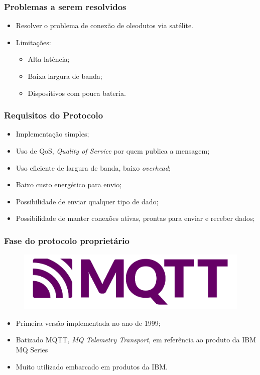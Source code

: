\documentclass[12pt]{beamer}
\begin{document}
\begin{frame}
    \frametitle{Problemas a serem resolvidos}
    \begin{itemize}
        \item Resolver o problema de conexão de oleodutos via satélite.
        \item Limitações:
            \begin{itemize}
                \item Alta latência;
                \item Baixa largura de banda;
                \item Dispositivos com pouca bateria.
            \end{itemize}
    \end{itemize}
        
\end{frame}

\begin{frame}
    \frametitle{Requisitos do Protocolo}
    \begin{itemize}
        \item Implementação simples;
        \item Uso de QoS, \textit{Quality of Service} por quem publica a mensagem;
        \item Uso eficiente de largura de banda, baixo \textit{overhead};
        \item Baixo custo energético para envio;
        \item Possibilidade de enviar qualquer tipo de dado;
        \item Possibilidade de manter conexões ativas, prontas para enviar e receber dados;
    \end{itemize}
\end{frame}

\begin{frame}
    \frametitle{Fase do protocolo proprietário}
    \begin{figure}[!htb]
        \centering
        \includegraphics[width=\textwidth]{logo_mqtt}
    \end{figure}
    \begin{itemize}
        \item Primeira versão implementada no ano de 1999;
        \item Batizado MQTT, \textit{MQ Telemetry Transport}, em referência ao produto da IBM MQ Series
        \item Muito utilizado embarcado em produtos da IBM.
    \end{itemize}
\end{frame}
\end{document}

